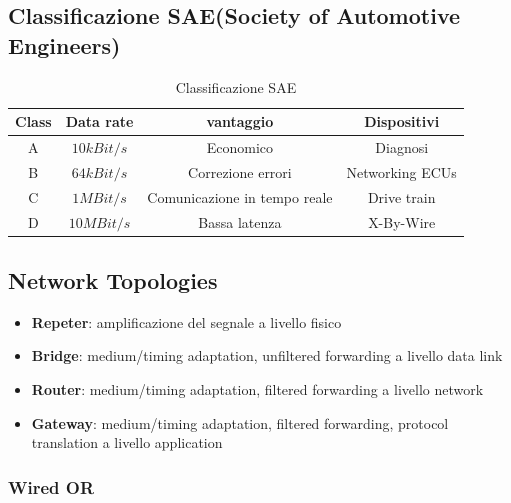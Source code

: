 \subsection{Classificazione SAE(Society of Automotive Engineers)}

\begin{table}
	\begin{adjustbox}{width=\columnwidth, center}
		\begin{tabular}{|c|c|c|c|}
			\hline
			Class & Data rate  & vantaggio                    & Dispositivi     \\
			\hline
			A     & $10kBit/s$ & Economico                    & Diagnosi        \\
			B     & $64kBit/s$ & Correzione errori            & Networking ECUs \\
			C     & $1MBit/s$  & Comunicazione in tempo reale & Drive train     \\
			D     & $10MBit/s$ & Bassa latenza                & X-By-Wire       \\
			\hline
		\end{tabular}
	\end{adjustbox}
	\caption{Classificazione SAE}
	\label{tab:classification_sae}
\end{table}



\subsection{Network Topologies}

\begin{itemize}
	\item \textbf{Repeter}: amplificazione del segnale a livello fisico
	\item \textbf{Bridge}: medium/timing adaptation, unfiltered forwarding a livello data link
	\item \textbf{Router}: medium/timing adaptation, filtered forwarding a livello network
	\item \textbf{Gateway}: medium/timing adaptation, filtered forwarding, protocol translation a livello application
\end{itemize}


\subsubsection{Wired OR}

